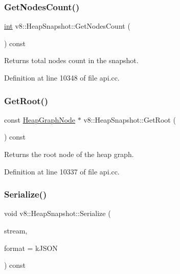 \subsubsection{\texorpdfstring{Get\+Nodes\+Count()}{GetNodesCount()}}
{\footnotesize\ttfamily \mbox{\hyperlink{classint}{int}} v8\+::\+Heap\+Snapshot\+::\+Get\+Nodes\+Count (\begin{DoxyParamCaption}{ }\end{DoxyParamCaption}) const}

Returns total nodes count in the snapshot. 

Definition at line 10348 of file api.\+cc.

\mbox{\label{classv8_1_1HeapSnapshot_ab636eb9db043fed952d87d03525bcbd5}} 
\subsubsection{\texorpdfstring{Get\+Root()}{GetRoot()}}
{\footnotesize\ttfamily const \mbox{\hyperlink{classv8_1_1HeapGraphNode}{Heap\+Graph\+Node}} $\ast$ v8\+::\+Heap\+Snapshot\+::\+Get\+Root (\begin{DoxyParamCaption}{ }\end{DoxyParamCaption}) const}

Returns the root node of the heap graph. 

Definition at line 10337 of file api.\+cc.

\mbox{\label{classv8_1_1HeapSnapshot_ad2e9773fcdc6785e799400c39d9eeba1}} 
\subsubsection{\texorpdfstring{Serialize()}{Serialize()}}
{\footnotesize\ttfamily void v8\+::\+Heap\+Snapshot\+::\+Serialize (\begin{DoxyParamCaption}\item[{\mbox{\hyperlink{classv8_1_1OutputStream}{Output\+Stream}} $\ast$}]{stream,  }\item[{Heap\+Snapshot\+::\+Serialization\+Format}]{format = {\ttfamily kJSON} }\end{DoxyParamCaption}) const}

